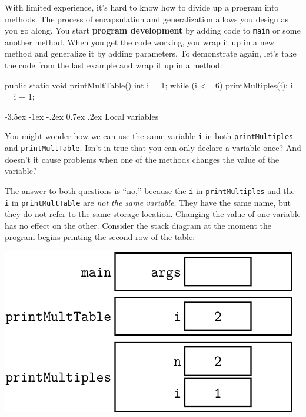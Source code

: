 \documentclass[12pt]{book}
\makeatletter
\renewcommand{\section}{\@startsection {section}{1}{\z@}%
    {-3.5ex \@plus -1ex \@minus -.2ex}%
    {0.7ex \@plus.2ex}%
    {\normalfont\Large\bfseries}}
\theoremstyle{exercise}
\makeatother
\begin{document}

With limited experience, it's hard to know how to divide up a program into methods.
The process of encapsulation and generalization allows you design as you go along.
You start {\bf program development} by adding code to {\tt main} or some another method.
When you get the code working, you wrap it up in a new method and generalize it by adding parameters.
To demonstrate again, let's take the code from the last example and wrap it up in a method:

\begin{code}
    public static void printMultTable() {
        int i = 1;
        while (i <= 6) {
            printMultiples(i);
            i = i + 1;
        }
    }
\end{code}


\section{Local variables}

You might wonder how we can use the same variable {\tt i} in both {\tt printMultiples} and {\tt printMultTable}.
Isn't in true that you can only declare a variable once?
And doesn't it cause problems when one of the methods changes the value of the variable?

The answer to both questions is ``no,'' because the {\tt i} in {\tt printMultiples} and the {\tt i} in {\tt printMultTable} are {\em not the same variable}.
They have the same name, but they do not refer to the same storage location.
Changing the value of one variable has no effect on the other.
Consider the stack diagram at the moment the program begins printing the second row of the table:

\begin{center}
\vspace{1ex}
\includegraphics{figs/stack4.pdf}
\vspace{1ex}
\end{center}
\end{document}
